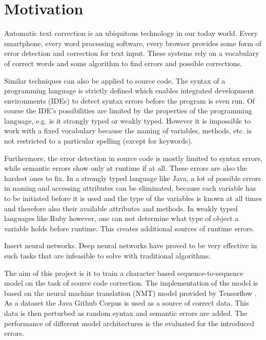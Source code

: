 \section{Motivation}
Automatic text correction is an ubiquitous technology in our today world. Every smartphone, every word processing software, every browser provides some form of error detection and correction for text input. These systems rely on a vocabulary of correct words and some algorithm to find errors and possible corrections.

Similar techniques can also be applied to source code. The syntax of a programming language is strictly defined which enables integrated development environments (IDEs) to detect syntax errors before the program is even run. Of course the IDE's possibilities are limited by the properties of the programming language, e.g. is it strongly typed or weakly typed. However it is impossible to work with a fixed vocabulary because the naming of variables, methods, etc. is not restricted to a particular spelling (except for keywords).

Furthermore, the error detection in source code is mostly limited to syntax errors, while semantic errors show only at runtime if at all. These errors are also the hardest ones to fix. In a strongly typed language like Java, a lot of possible errors in naming and accessing attributes can be eliminated, because each variable has to be initiated before it is used and the type of the variables is known at all times and therefore also their available attributes and methods. In weakly typed languages like Ruby however, one can not determine what type of object a variable holds before runtime. This creates additional sources of runtime errors.

Insert neural networks. Deep neural networks have proved to be very effective in such tasks that are infeasible to solve with traditional algorithms.

The aim of this project is it to train a character based sequence-to-sequence model on the task of source code correction. The implementation of the model is based on the neural machine translation (NMT) model provided by Tensorflow \cite{seq2seq_tutorial}. As a dataset the Java Github Corpus \cite{java_dataset} is used as a source of correct data. This data is then perturbed as random syntax and semantic errors are added. The performance of different model architectures is the evaluated for the introduced errors. 

